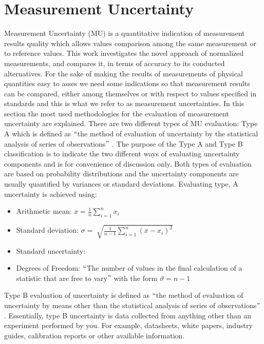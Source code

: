 \section{Measurement Uncertainty}
Measurement Uncertainty (MU) is a quantitative indication of measurement results quality which allows values comparison among the same measurement or to reference values. This work investigates the novel approach of normalized measurements, and compares it, in terms of accuracy to its conducted alternatives. For the sake of making the results of measurements of physical quantities easy to asses we need some indications so that measurement results can be compared, either among themselves or with respect to values specified in standards and this is what we refer to as measurement uncertainties. In this section the most used methodologies for the evaluation of measurement uncertainty are explained. There are two different types of MU evaluation: Type A which is defined as $``$the method of evaluation of uncertainty by the statistical analysis of series of observations$"$ \cite{jcgm}.
The purpose of the Type A and Type B classification is to indicate the two different ways of evaluating uncertainty components and is for convenience of discussion only. Both types of evaluation are based on probability distributions and the uncertainty components are usually quantified by variances or standard deviations.
Evaluating type, A uncertainty is achieved using:
\begin{itemize}
	\item Arithmetic mean:  $\overline{x}=\frac{1}{n} \sum _{i=1}^{n}x_{i}$

	\item Standard deviation: $\sigma = \sqrt[]{\frac{1}{n-1} \sum _{i=1}^{n} \left( \overline{x}-x_{i} \right) ^{2}}$

	\item Standard uncertainty:

	\item Degrees of Freedom: $``$The number of values in the final calculation of a statistic that are free to vary$"$  with the form  $\vartheta =n-1$
\end{itemize}
Type B evaluation of uncertainty is defined as $``$the method of evaluation of uncertainty by means other than the statistical analysis of series of observations$"$ \cite{jcgm}. Essentially, type B uncertainty is data collected from anything other than an experiment performed by you. For example, datasheets, white papers, industry guides, calibration reports or other available information.